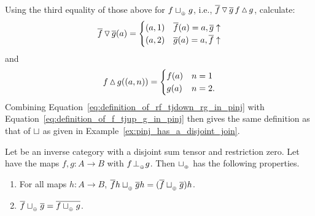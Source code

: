 \begin{example}\label{ex:tensor_join_in_pinj}
  Using the third equality of those above for $f\sqcup_{{_{\oplus}}} g$, i.e.,
  $\overline{f}\operatorname{\triangledown}\overline{g}\,  f\operatorname{\vartriangle} g$, calculate:
  \begin{equation}
    \overline{f}\operatorname{\triangledown}\overline{g}(a) =
    \begin{cases}
      (a,1) & \overline{f}(a) = a, \overline{g}\uparrow\\
      (a,2) & \overline{g}(a) = a, \overline{f}\uparrow
    \end{cases}\label{eq:definition_of_rf_tjdown_rg_in_pinj}
  \end{equation}
  and
  \begin{equation}
    f\operatorname{\vartriangle} g((a,n)) =
    \begin{cases}
      f(a)  & n = 1\\
      g(a)  & n=2.
    \end{cases}\label{eq:definition_of_f_tjup_g_in_pinj}
  \end{equation}
  Combining Equation~\ref{eq:definition_of_rf_tjdown_rg_in_pinj} with
  Equation~\ref{eq:definition_of_f_tjup_g_in_pinj} then gives the same definition as that of
  $\sqcup$ as given in Example~\ref{ex:pinj_has_a_disjoint_join}.
\end{example}
\begin{lemma}\label{lem:tensor_disjoint_join_properties}
  Let \X be an inverse category with a disjoint sum tensor and restriction zero. Let \X have the
  maps $f,g: A \to B$ with $f{}_{{}_{}}{\perp_{{}_{\oplus}}} g$. Then $\sqcup_{{_{\oplus}}}$ has the following properties.
  \begin{enumerate}[{(}i{)}]
    \item For all maps $h:A \to B$, $\overline{f}h \sqcup_{{_{\oplus}}} \overline{g}h = (\overline{f}\sqcup_{{_{\oplus}}} \overline{g})h$.
      \label{lemitem:tdj_rst_universal}
    \item $\overline{f}\sqcup_{{_{\oplus}}} \overline{g} = \overline{f\sqcup_{{_{\oplus}}} g}$. \label{lemitem:tdj_rst_is_rst}
  \end{enumerate}
\end{lemma}
